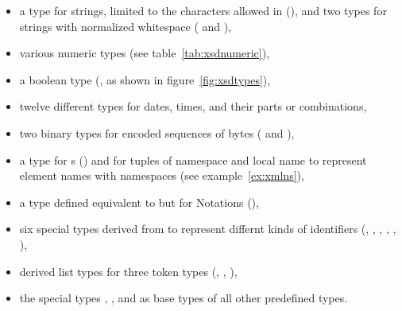 \begin{itemize}
 \item a type for  strings, limited to the characters allowed
       in  (), and two types for strings with normalized
	   whitespace ( and ),
 \item various numeric types (see table~\ref{tab:xsdnumeric}),
 \item a boolean type (, as shown in figure~\ref{fig:xsdtypes}),
 \item twelve different types for dates, times, and their parts or combinations,
 \item two binary types for encoded sequences of bytes ( and ),
 \item a type for s () and for tuples of namespace
        and local name to represent  element names with 
	   namespaces (see example~\ref{ex:xmlns}),
 \item a type defined equivalent to  but for  Notations
       (),
 \item six special types derived from  to represent differnt kinds of
       identifiers (, , , , 
	   , ),
 \item derived list types for three token types (,
  , ),
 \item the special types , , and 
   as base types of all other predefined types.
\end{itemize}


